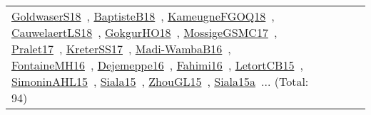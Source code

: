 {\begin{longtable}{lp{3cm}>{\raggedright\arraybackslash}p{6cm}>{\raggedright\arraybackslash}p{6cm}>{\raggedright\arraybackslash}p{8cm}}
\href{../works/GoldwaserS18.pdf}{GoldwaserS18}~\cite{GoldwaserS18}, \href{../works/BaptisteB18.pdf}{BaptisteB18}~\cite{BaptisteB18}, \href{../works/KameugneFGOQ18.pdf}{KameugneFGOQ18}~\cite{KameugneFGOQ18}, \href{../works/CauwelaertLS18.pdf}{CauwelaertLS18}~\cite{CauwelaertLS18}, \href{../works/GokgurHO18.pdf}{GokgurHO18}~\cite{GokgurHO18}, \href{../works/MossigeGSMC17.pdf}{MossigeGSMC17}~\cite{MossigeGSMC17}, \href{../works/Pralet17.pdf}{Pralet17}~\cite{Pralet17}, \href{../works/KreterSS17.pdf}{KreterSS17}~\cite{KreterSS17}, \href{../works/Madi-WambaB16.pdf}{Madi-WambaB16}~\cite{Madi-WambaB16}, \href{../works/FontaineMH16.pdf}{FontaineMH16}~\cite{FontaineMH16}, \href{../works/Dejemeppe16.pdf}{Dejemeppe16}~\cite{Dejemeppe16}, \href{../works/Fahimi16.pdf}{Fahimi16}~\cite{Fahimi16}, \href{../works/LetortCB15.pdf}{LetortCB15}~\cite{LetortCB15}, \href{../works/SimoninAHL15.pdf}{SimoninAHL15}~\cite{SimoninAHL15}, \href{../works/Siala15.pdf}{Siala15}~\cite{Siala15}, \href{../works/ZhouGL15.pdf}{ZhouGL15}~\cite{ZhouGL15}, \href{../works/Siala15a.pdf}{Siala15a}~\cite{Siala15a}... (Total: 94)\\

\end{longtable}}
